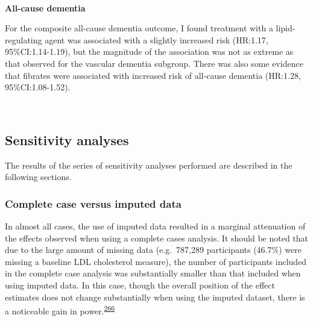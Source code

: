 \documentclass[a4paper, twoside]{templates/ociamthesis}
\begin{document}
~

\textbf{All-cause dementia}

For the composite all-cause dementia outcome, I found treatment with a lipid-regulating agent was associated with a slightly increased risk (HR:1.17, 95\%CI:1.14-1.19), but the magnitude of the association was not as extreme as that observed for the vascular dementia subgroup. There was also some evidence that fibrates were associated with increased risk of all-cause dementia (HR:1.28, 95\%CI:1.08-1.52).

~

\hypertarget{sensitivity-analyses-2}{%
\subsection{Sensitivity analyses}\label{sensitivity-analyses-2}}

The results of the series of sensitivity analyses performed are described in the following sections.

\hypertarget{complete-case-versus-imputed-data}{%
\subsubsection{Complete case versus imputed data}\label{complete-case-versus-imputed-data}}

In almost all cases, the use of imputed data resulted in a marginal attenuation of the effects observed when using a complete cases analysis. It should be noted that due to the large amount of missing data (e.g.~787,289 participants (46.7\%) were missing a baseline LDL cholesterol measure), the number of participants included in the complete case analysis was substantially smaller than that included when using imputed data. In this case, though the overall position of the effect estimates does not change substantially when using the imputed dataset, there is a noticeable gain in power.\textsuperscript{\protect\hyperlink{ref-sterne2009}{266}}

~
\end{document}
